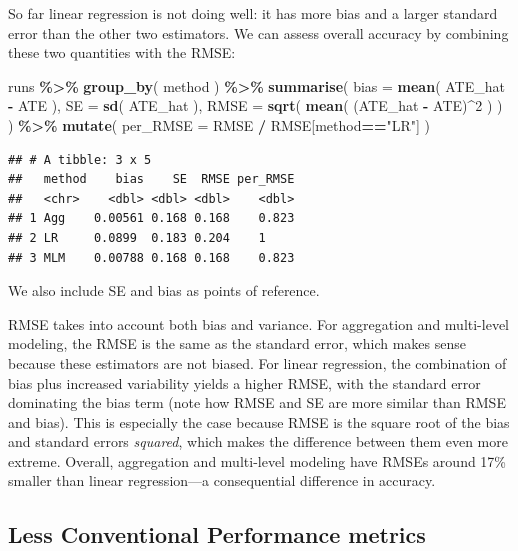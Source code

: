 \documentclass[
]{book}
\newenvironment{Shaded}{\begin{snugshade}}{\end{snugshade}}
\newcommand{\AttributeTok}[1]{\textcolor[rgb]{0.13,0.29,0.53}{#1}}
\newcommand{\DecValTok}[1]{\textcolor[rgb]{0.00,0.00,0.81}{#1}}
\newcommand{\FunctionTok}[1]{\textcolor[rgb]{0.13,0.29,0.53}{\textbf{#1}}}
\newcommand{\NormalTok}[1]{#1}
\newcommand{\SpecialCharTok}[1]{\textcolor[rgb]{0.81,0.36,0.00}{\textbf{#1}}}
\newcommand{\StringTok}[1]{\textcolor[rgb]{0.31,0.60,0.02}{#1}}
\begin{document}
So far linear regression is not doing well: it has more bias and a larger standard error than the other two estimators.
We can assess overall accuracy by combining these two quantities with the RMSE:

\begin{Shaded}
\begin{Highlighting}[]
\NormalTok{runs }\SpecialCharTok{\%\textgreater{}\%} 
  \FunctionTok{group\_by}\NormalTok{( method ) }\SpecialCharTok{\%\textgreater{}\%}
  \FunctionTok{summarise}\NormalTok{( }
    \AttributeTok{bias =} \FunctionTok{mean}\NormalTok{( ATE\_hat }\SpecialCharTok{{-}}\NormalTok{ ATE ),}
    \AttributeTok{SE =} \FunctionTok{sd}\NormalTok{( ATE\_hat ),}
    \AttributeTok{RMSE =} \FunctionTok{sqrt}\NormalTok{( }\FunctionTok{mean}\NormalTok{( (ATE\_hat }\SpecialCharTok{{-}}\NormalTok{ ATE)}\SpecialCharTok{\^{}}\DecValTok{2}\NormalTok{ ) )}
\NormalTok{  ) }\SpecialCharTok{\%\textgreater{}\%}
  \FunctionTok{mutate}\NormalTok{( }
    \AttributeTok{per\_RMSE =}\NormalTok{ RMSE }\SpecialCharTok{/}\NormalTok{ RMSE[method}\SpecialCharTok{==}\StringTok{"LR"}\NormalTok{]}
\NormalTok{  )}
\end{Highlighting}
\end{Shaded}

\begin{verbatim}
## # A tibble: 3 x 5
##   method    bias    SE  RMSE per_RMSE
##   <chr>    <dbl> <dbl> <dbl>    <dbl>
## 1 Agg    0.00561 0.168 0.168    0.823
## 2 LR     0.0899  0.183 0.204    1    
## 3 MLM    0.00788 0.168 0.168    0.823
\end{verbatim}

We also include SE and bias as points of reference.

RMSE takes into account both bias and variance.
For aggregation and multi-level modeling, the RMSE is the same as the standard error, which makes sense because these estimators are not biased.
For linear regression, the combination of bias plus increased variability yields a higher RMSE, with the standard error dominating the bias term (note how RMSE and SE are more similar than RMSE and bias).
This is especially the case because RMSE is the square root of the bias and standard errors \emph{squared}, which makes the difference between them even more extreme.
Overall, aggregation and multi-level modeling have RMSEs around 17\% smaller than linear regression---a consequential difference in accuracy.

\subsection{Less Conventional Performance metrics}\label{less-conventional-performance-metrics}
\end{document}

